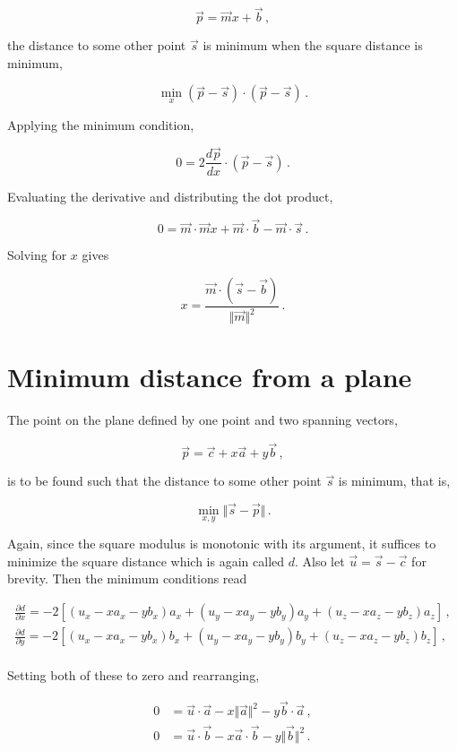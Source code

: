 \documentclass{article}
\begin{document}
$$ \vec{p} = \vec{m} x + \vec{b} \,,$$

the distance to some other point $\vec{s}$ is minimum when the square distance is minimum,

$$ \min_x (\vec{p} - \vec{s})\cdot (\vec{p} - \vec{s}) \,. $$ 

Applying the minimum condition,

$$ 0 = 2 \frac{d\vec{p}}{dx} \cdot (\vec{p} - \vec{s}) \,.$$

Evaluating the derivative and distributing the dot product,

$$0 = \vec m \cdot \vec m x + \vec m \cdot \vec b - \vec m \cdot \vec s \,. $$

Solving for $x$ gives

$$ x = \frac{\vec{m}\cdot(\vec{s}-\vec{b})}{\Vert\vec m \Vert^2} \,. $$

\section{Minimum distance from a plane}

The point on the plane defined by one point and two spanning vectors,

$$\vec{p} = \vec{c} + x\vec{a} + y\vec{b} \,, $$

is to be found such that the distance to some other point $\vec{s}$ is minimum, that is,

$$\min_{x,y} \Vert \vec{s} - \vec{p} \Vert \,. $$

Again, since the square modulus is monotonic with its argument, it suffices to minimize the square distance which is again called $d$. Also let $\vec{u} = \vec{s} - \vec{c}$ for brevity. Then the minimum conditions read

\begin{align*}
    \frac{\partial d}{\partial x} = -2[(u_x - xa_x -yb_x)a_x + (u_y - xa_y -yb_y)a_y + (u_z-xa_z-yb_z)a_z] \,,\\
    \frac{\partial d}{\partial y} = -2[(u_x - xa_x -yb_x)b_x + (u_y - xa_y -yb_y)b_y + (u_z-xa_z-yb_z)b_z] \,,\\
\end{align*}

Setting both of these to zero and rearranging,

\begin{align*}
    0&=\vec{u}\cdot\vec{a} - x\Vert \vec{a}\Vert^2 - y\vec{b}\cdot\vec{a} \,,\\
    0&=\vec{u}\cdot\vec{b} - x\vec{a}\cdot\vec{b} - y\Vert\vec{b}\Vert^2 \,.
\end{align*}
\end{document}
